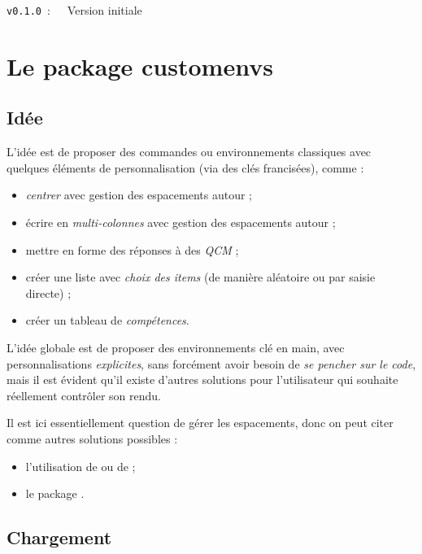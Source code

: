 \documentclass[french,11pt,a4paper]{article}
\begin{document}
\verb|v0.1.0|~:~~~Version initiale

\pagebreak

\section{Le package customenvs}

\subsection{Idée}

L'idée est de proposer des commandes ou environnements classiques avec quelques éléments de personnalisation (via des \textsf{clés} francisées), comme :

\begin{itemize}
	\item \textit{centrer} avec gestion des espacements autour ;
	\item écrire en \textit{multi-colonnes} avec gestion des espacements autour ;
	\item mettre en forme des réponses à des \textit{QCM} ;
	\item créer une liste avec \textit{choix des items} (de manière aléatoire ou par saisie directe) ;
	\item créer un tableau de \textit{compétences}.
\end{itemize}

\smallskip

L'idée globale est de proposer des environnements clé en main, avec personnalisations \textit{explicites}, sans forcément avoir besoin de \textit{se pencher sur le code}, mais il est évident qu'il existe d'autres solutions pour l'utilisateur qui souhaite réellement contrôler son rendu.

\smallskip

Il est ici essentiellement question de gérer les espacements, donc on peut citer comme autres solutions possibles :

\begin{itemize}
	\item l'utilisation de  ou de  ;
	\item le package .
\end{itemize}

\subsection{Chargement}
\end{document}
